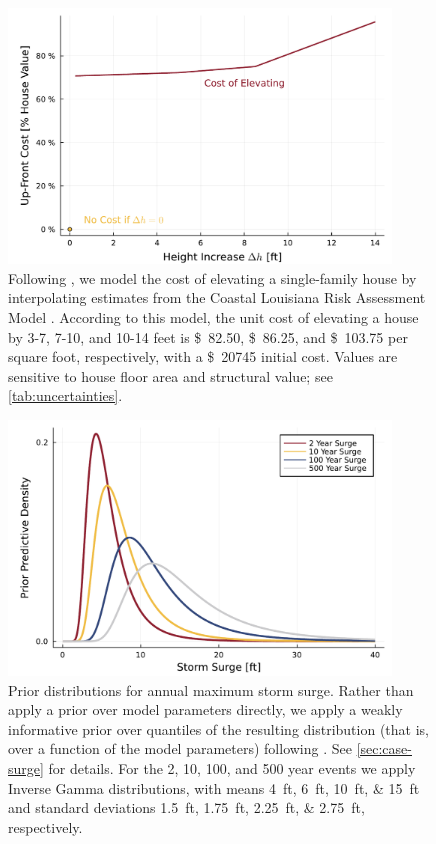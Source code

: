 \documentclass[ef,draft]{agutexSI2019}
\newcommand{\usd}[1]{\SI{#1}[\$]{}}
\begin{document}
\begin{figure}
    \centering
    \includegraphics[width=4in]{cost-up-front}
    \caption{
        Following , we model the cost of elevating a single-family house by interpolating estimates from the Coastal Louisiana Risk Assessment Model \cite{johnson_clara:2013}.
        According to this model, the unit cost of elevating a house by 3-7, 7-10, and 10-14 feet is \usd{82.50}, \usd{86.25}, and \usd{103.75} per square foot, respectively, with a \usd{20745} initial cost.
        Values are sensitive to house floor area and structural value; see \cref{tab:uncertainties}.
    }\label{fig:cost-up-front}
\end{figure}

\begin{figure}
    \centering
    \includegraphics[width=4in]{surge-gev-priors}
    \caption{
        Prior distributions for annual maximum storm surge.
        Rather than apply a prior over model parameters directly, we apply a weakly informative prior over quantiles of the resulting distribution (that is, over a function of the model parameters) following .
        See \cref{sec:case-surge} for details.
        For the 2, 10, 100, and 500 year events we apply Inverse Gamma distributions, with means \SIlist{4;6;10;15}{ft} and standard deviations \SIlist{1.5;1.75;2.25;2.75}{ft}, respectively.
    }\label{fig:surge-gev-priors}
\end{figure}
\end{document}
